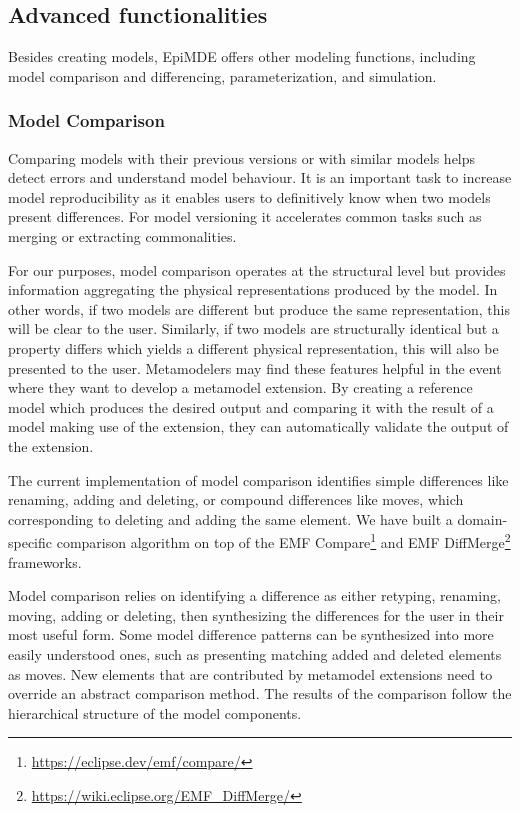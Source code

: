 \subsection{Advanced functionalities}

Besides creating models, EpiMDE offers other modeling functions, including model comparison and differencing, parameterization, and simulation.

\subsubsection{Model Comparison}

Comparing models with their previous versions or with similar models helps detect errors and understand model behaviour. It is an important task to increase model reproducibility as it enables users to definitively know when two models present differences. For model versioning it accelerates common tasks such as merging or extracting commonalities.

For our purposes, model comparison operates at the structural level but provides information aggregating the physical representations produced by the model. In other words, if two models are different but produce the same representation, this will be clear to the user. Similarly, if two models are structurally identical but a property differs which yields a different physical representation, this will also be presented to the user. Metamodelers may find these features helpful in the event where they want to develop a metamodel extension. By creating a reference model which produces the desired output and comparing it with the result of a model making use of the extension, they can automatically validate the output of the extension.

The current implementation of model comparison identifies simple differences like renaming, adding and deleting, or compound differences like moves, which corresponding to deleting and adding the same element. We have built a domain-specific comparison algorithm on top of the EMF Compare\footnote{\url{https://eclipse.dev/emf/compare/}} and EMF DiffMerge\footnote{\url{https://wiki.eclipse.org/EMF_DiffMerge/}} frameworks. 

Model comparison relies on identifying a difference as either retyping, renaming, moving, adding or deleting, then synthesizing the differences for the user in their most useful form.
Some model difference patterns can be synthesized into more easily understood ones, such as presenting matching added and deleted elements as moves. New elements that are contributed by metamodel extensions need to override an abstract comparison method. The results of the comparison follow the hierarchical structure of the model components.

